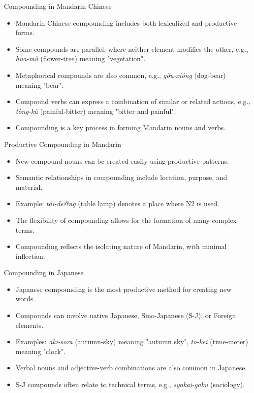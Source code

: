 \documentclass{beamer}
\begin{document}
\begin{frame}{Compounding in Mandarin Chinese}
    \begin{itemize}
        \item Mandarin Chinese compounding includes both lexicalized and productive forms.
        \item Some compounds are parallel, where neither element modifies the other, e.g., \textit{huā-mù} (flower-tree) meaning "vegetation".
        \item Metaphorical compounds are also common, e.g., \textit{gǒu-xióng} (dog-bear) meaning "bear".
        \item Compound verbs can express a combination of similar or related actions, e.g., \textit{tòng-kǔ} (painful-bitter) meaning "bitter and painful".
        \item Compounding is a key process in forming Mandarin nouns and verbs.
    \end{itemize}
\end{frame}

\begin{frame}{Productive Compounding in Mandarin}
    \begin{itemize}
        \item New compound nouns can be created easily using productive patterns.
        \item Semantic relationships in compounding include location, purpose, and material.
        \item Example: \textit{tái-de@ng} (table lamp) denotes a place where N2 is used.
        \item The flexibility of compounding allows for the formation of many complex terms.
        \item Compounding reflects the isolating nature of Mandarin, with minimal inflection.
    \end{itemize}
\end{frame}

\begin{frame}{Compounding in Japanese}
    \begin{itemize}
        \item Japanese compounding is the most productive method for creating new words.
        \item Compounds can involve native Japanese, Sino-Japanese (S-J), or Foreign elements.
        \item Examples: \textit{aki-sora} (autumn-sky) meaning "autumn sky", \textit{to-kei} (time-meter) meaning "clock".
        \item Verbal nouns and adjective-verb combinations are also common in Japanese.
        \item S-J compounds often relate to technical terms, e.g., \textit{syakai-gaku} (sociology).
    \end{itemize}
\end{frame}
\end{document}

